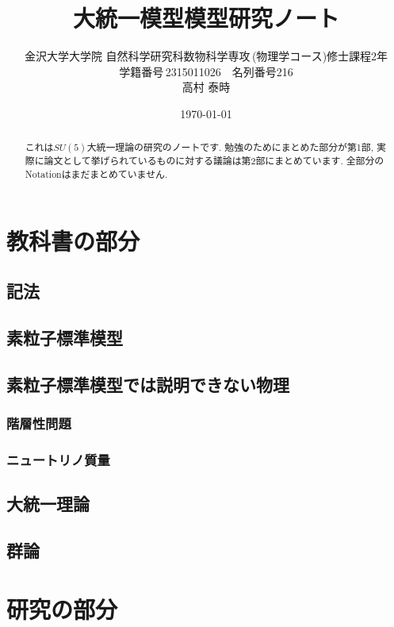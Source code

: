 \documentclass[uplatex,dvipdfmx,a4paper,titlepage]{jsbook}
\theoremstyle{plain}
\theoremstyle{definition}
\begin{document}
\title{大統一模型模型研究ノート}
\author{金沢大学大学院\,\,自然科学研究科数物科学専攻\,(物理学コース)修士課程2年\\学籍番号\,2315011026$\quad$名列番号216\\高村 泰時} 
\date{\today}
\maketitle


\tableofcontents
\clearpage


\begin{abstract}
  これは$SU(5)$大統一理論の研究のノートです.
  勉強のためにまとめた部分が第1部, 実際に論文として挙げられているものに対する議論は第2部にまとめています.
  全部分のNotationはまだまとめていません.
\end{abstract}


\part{教科書の部分}

\chapter{記法}


\chapter{素粒子標準模型}


\chapter{素粒子標準模型では説明できない物理}


\section{階層性問題}


\section{ニュートリノ質量}


\chapter{大統一理論}


\chapter{群論}



\part{研究の部分}



\end{document}
